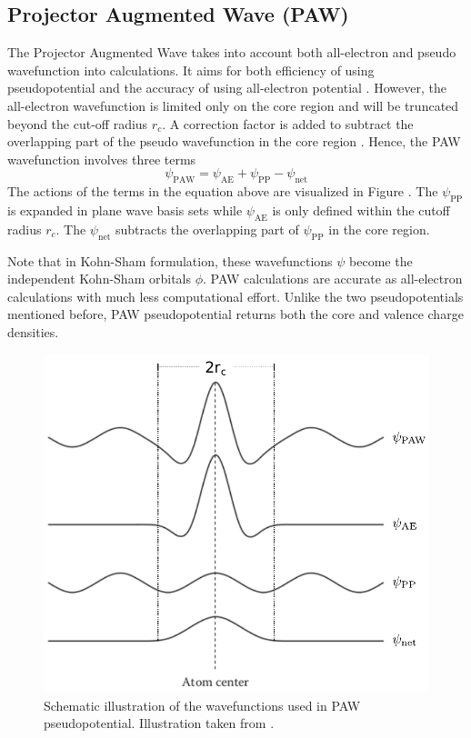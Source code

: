 \subsection{Projector Augmented Wave (PAW)}
The Projector Augmented Wave takes into account both all-electron and pseudo wavefunction into calculations. It aims 
for both efficiency of using pseudopotential and the accuracy of using all-electron potential \citep{Bloechl1994,Kresse1999}. However, the all-electron wavefunction is limited only on the core region and will be truncated beyond the cut-off radius $r_c$. A correction factor is added to subtract the overlapping part of the pseudo wavefunction in the core region \citep{Rostgaard2009}. Hence, the PAW wavefunction involves three terms
\begin{equation}
    \psi_{\text{PAW}} =  \psi_{\text{AE}} + \psi_{\text{PP}}  - \psi_{\text{net}}
\end{equation}
The actions of the terms in the equation above are visualized in Figure . The $\psi_{\text{PP}}$ is expanded in plane wave basis sets while $\psi_{\text{AE}}$ is only defined within the cutoff radius $r_c$. The $\psi_{\text{net}}$ subtracts the overlapping part of $\psi_{\text{PP}}$ in the core region. 

Note that in Kohn-Sham formulation, these wavefunctions $\psi$ become the independent Kohn-Sham orbitals $\phi$. PAW calculations are accurate as all-electron calculations with much less computational effort. Unlike the two pseudopotentials mentioned before, PAW pseudopotential returns both the core and valence charge densities. 

\begin{figure}[tbh!]
    \centering
    \includegraphics[width=0.48\linewidth]{"images/computational/PAW"}
    \caption[ Schematic illustration of the wavefunctions used in PAW pseudopotential]{Schematic illustration of the wavefunctions used in PAW pseudopotential. Illustration taken from \citep{Lee2016}.}
    \label{fig:PAW}
\end{figure}

